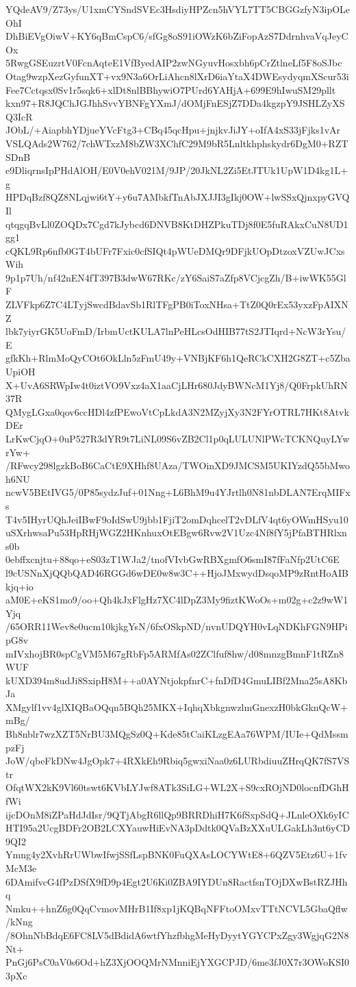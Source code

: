 YQdeAV9/Z73ys/U1xmCYSndSVEc3HsdiyHPZcn5hVYL7TT5CBGGzfyN3ipOLeOhI
DhBiEVgOiwV+KY6qBmCspC6/sfGg8oS91iOWzK6bZiFopAzS7DdrnhvaVqJeyCOx
5RwgGSEuzrtV0FcnAqteE1VfByedAIP2zwNGyuvHosxbh6pCrZtlneLf5F8oSJbc
Otag9wzpXezGyfunXT+vx9N3a6OrLiAhcn8lXrD6iaYtaX4DWEsydyqmXScur53i
Fee7Cctqsx0Sv1r5sqk6+xlDt8nlBBhywiO7PUrd6YAHjA+699E9hIwuSM29pllt
kxn97+R8JQChJGJhhSvvYBNFgYXmJ/dOMjFnESjZ7DDa4kgzpY9JSHLZyXSQ3IcR
JObL/+AiapbhYDjueYVcFtg3+CBq45qcHpu+jnjkvJiJY+oIfA4xS33jFjks1vAr
VSLQAds2W762/7chWTxzM8bZW3XChfC29M9bR5Lnltkhphskydr6DgM0+RZTSDnB
e9DliqrnsIpPHdAlOH/E0V0ehV021M/9JP/20JkNL2Zi5EtJTUk1UpW1D4kg1L+g
HPDqBzf8QZ8NLqjwi6tY+y6u7AMbkfTnAbJXJJI3gIkj0OW+lwSSxQjnxpyGVQIl
qtqgqBvLl0ZOQDx7Cgd7kJybcd6DNVB8KtDHZPkuTDj8f0E5fuRAkxCuN8UD1gg1
cQKL9Rp6nfb0GT4bUFr7Fxic0cfSIQt4pWUeDMQr9DFjkUOpDtzoxVZUwJCxsWih
9p1p7Uh/nf42nEN4fT397B3dwW67RKc/zY6SaiS7aZfp8VCjcgZh/B+iwWK55GlF
ZLVFkp6Z7C4LTyjSwcdBdavSb1RlTFgPB0iToxNHsa+TtZ0Q0rEx53yxzFpAIXNZ
lbk7yiyrGK5UoFmD/IrbmUctKULA7lnPeHLcsOdHIB77tS2JTIqrd+NcW3rYsu/E
gfkKh+RlmMoQyCOt6OkLln5zFmU49y+VNBjKF6h1QeRCkCXH2G8ZT+c5ZbaUpiOH
X+UvA6SRWpIw4t0iztVO9Vxz4aX1aaCjLHr680JdyBWNcM1Yj8/Q0FrpkUhRN37R
QMygLGxa0qov6ccHDl4zfPEwoVtCpLkdA3N2MZyjXy3N2FYrOTRL7HKt8AtvkDEr
LrKwCjqO+0uP527R3dYR9t7LiNL09S6vZB2Cl1p0qLULUNlPWcTCKNQuyLYwrYw+
/RFwcy298lgzkBoB6CaCtE9XHhf8UAza/TWOinXD9JMCSM5UKIYzdQ55bMwoh6NU
ncwV5BEtIVG5/0P85sydzJuf+01Nng+L6BhM9u4YJrtlh0N81nbDLAN7ErqMIFxs
T4v5IHyrUQhJeiIBwF9oIdSwU9jbb1FjiT2omDqhcelT2vDLfV4qt6yOWmHSyu10
uSXrhwsaPu53HpRHjWGZ2HKnhuxOtEBgw6Rvw2V1Uzc4Nf8fY5jPfaBTHRlxns0b
0ebffxcnjtu+88qo+eS03zT1WJa2/tnofVIvbGwRBXgmfO6smI87fFaNfp2UtC6E
l9cUSNnXjQQbQAD46RGGd6wDE0w8w3C++HjoJMxwydDsqoMP9zRntHoAIBkjq+io
aM0E+eKS1mo9/oo+Qh4kJxFlgHz7XC4lDpZ3My9fiztKWoOs+m02g+c2z9wW1Yjq
/65ORR11Wev8e0ucm10kjkgYsN/6fxOSkpND/nvnUDQYH0vLqNDKhFGN9HPipG8v
mIVxhojBR0spCgVM5M67gRbFp5ARMfAs02ZClfuf8hw/d08mnzgBmnF1tRZn8WUF
kUXD394m8udJi8SxipH8M++a0AYNtjokpfnrC+fnDfD4GmuLIBf2Mna25sA8KbJa
XMgylf1vv4glXIQBaOQqn5BQh25MKX+IqhqXbkgnwzlmGnexzH0bkGknQcW+mBg/
Bh8nblr7wzXZT5NrBU3MQgSz0Q+Kde85tCaiKLzgEAa76WPM/IUIe+QdMssmpzFj
JoW/qbeFkDNw4JgOpk7+4RXkEh9Rbiq5gwxiNaa0z6LURbdiuuZHrqQK7fS7VStr
OfqtWX2kK9Vl60tswt6KVbLYJwf8ATk3SiLG+WL2X+S9cxROjND0locnfDGhHfWi
ijcDOnM8iZPaHdJdIsr/9QTjAbgR6llQp9BRRDhiH7K6fSxpSdQ+JLnleOXk6yIC
HTI95a2UcgBDFr2OB2LCXYauwHiEvNA3pDdtk0QVaBzXXuULGakLh3nt6yCD9QI2
Ymng4y2XvhRrUWbwIfwjSSfLspBNK0FuQXAsLOCYWtE8+6QZV5Etz6U+1fvMcM3e
6DAmifvcG4fPzDSfX9fD9p4Egt2U6Ki0ZBA9IYDUn8RactfsnTOjDXwBstRZJHhq
Nmku++hnZ6g0QqCvmovMHrB1If8xp1jKQBqNFFtoOMxvTTtNCVL5GbaQflw/kNng
/8OhnNbBdqE6FC8LV5dBdidA6wtfYhzfbhgMeHyDyytYGYCPxZgy3WgjqG2N8Nt+
PnGj6PsC0aV0s6Od+hZ3XjOOQMrNMnniEjYXGCPJD/6me3fJ0X7r3OWoKSI03pXc
